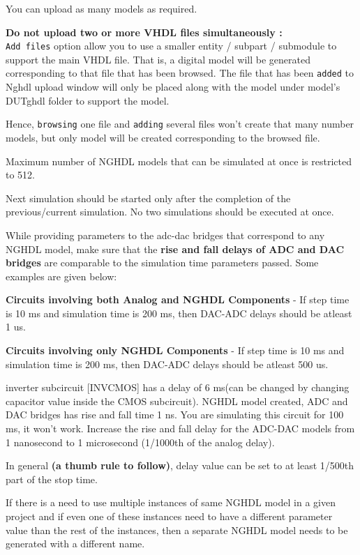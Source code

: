 \begin{compactenum}
\begin{compactenum}
        You can upload as many models as required.
    \end{compactenum}
\item \textbf{Do not upload two or more VHDL files simultaneously :}    \\
\texttt{Add files} option allow you to use a smaller entity / subpart / submodule to support the main VHDL file. That is, a digital model will be generated corresponding to that file that has been browsed. The file that has been \texttt{added} to Nghdl upload window will only be placed along with the model under model’s DUTghdl folder to support the model.

Hence, \texttt{browsing} one file and \texttt{adding} several files won’t create that many number models, but only model will be created corresponding to the browsed file.
\item Maximum number of NGHDL models that can be simulated at once is restricted to 512.
\item Next simulation should be started only after the completion of the previous/current  simulation. No two simulations should be executed at once.
\item While providing parameters to the adc-dac bridges that correspond to any NGHDL model, make sure that the \textbf{rise and fall delays of ADC and DAC bridges} are comparable to the simulation time parameters passed. Some examples are given below: \\
        \begin{compactenum}
        \item \textbf{Circuits involving both Analog and NGHDL Components} - If step time is 10 ms and simulation time is 200 ms, then DAC-ADC delays should be atleast 1 us.
        \item \textbf{Circuits involving only NGHDL Components} - If step time is 10 ms and simulation time is 200 ms, then DAC-ADC delays should be atleast 500 us.
        \item \textbfCMOS inverter subcircuit [INVCMOS] has a delay of 6 ms(can be changed by changing capacitor value inside the CMOS subcircuit). 
        NGHDL model created, ADC and DAC bridges has rise and fall time 1 ns. You are simulating this circuit for 100 ms, it won’t work. Increase the rise and fall delay for the ADC-DAC models from 1 nanosecond to 1 microsecond (1/1000th of the analog delay).
        \end{compactenum}
        
        In general \textbf{(a thumb rule to follow)}, delay value can be set to at least 1/500th part of the stop time.
\item If there is a need to use multiple instances of same NGHDL model in a given project and if even one of these instances need to have a different parameter value than the rest of the instances, then a separate NGHDL model needs to be generated with a different name.
\end{compactenum}

